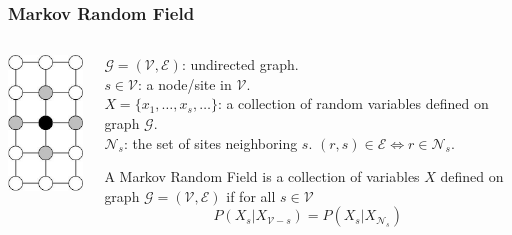 \documentclass[serif]{beamer}
\begin{document}
\begin{frame}
\frametitle{Markov Random Field}
\begin{columns}
  \begin{column}{3cm}
    \includegraphics[width=3cm]{sfig/mrf}
  \end{column}

  \begin{column}{7cm}
    \begin{definition}
      $\mathcal{G} = (\mathcal{V}, \mathcal{E})$: undirected graph.\\
      $s \in \mathcal{V}$: a node/site in $\mathcal{V}$. \\
      $X = \{x_1, \dots, x_s, \dots \}$: a collection of random variables defined on graph $\mathcal{G}$.\\
      $\mathcal{N}_s$: the set of sites neighboring $s$. $(r,s) \in \mathcal{E} \Leftrightarrow  r\in \mathcal{N}_s $.
    \end{definition}

    \begin{definition}
      A \alert{Markov Random Field} is a collection of variables $X$ defined on
      graph $\mathcal{G} = (\mathcal{V}, \mathcal{E})$ if for all $s \in
      \mathcal{V}$
      \begin{equation*}
        P(X_s | X_{\mathcal{V}-s}) = P(X_s | X_{\mathcal{N}_s})
      \end{equation*}
    \end{definition}
  \end{column}
  \end{columns}
\end{frame}
\end{document}
